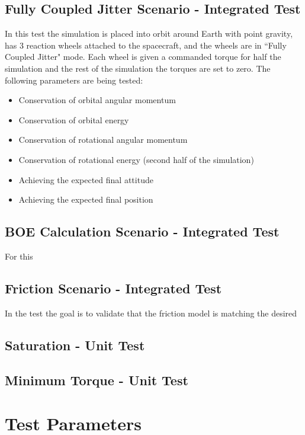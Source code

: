 \subsection{Fully Coupled Jitter Scenario - Integrated Test}
In this test the simulation is placed into orbit around Earth with point gravity, has 3 reaction wheels attached to the spacecraft, and the wheels are in ``Fully Coupled Jitter" mode. Each wheel is given a commanded torque for half the simulation and the rest of the simulation the torques are set to zero. The following parameters are being tested:
\begin{itemize}
\item Conservation of orbital angular momentum
\item Conservation of orbital energy
\item Conservation of rotational angular momentum
\item Conservation of rotational energy (second half of the simulation)
\item Achieving the expected final attitude
\item Achieving the expected final position
\end{itemize}

\subsection{BOE Calculation Scenario - Integrated Test}

For this 

\subsection{Friction Scenario - Integrated Test}

In the test the goal is to validate that the friction model is matching the desired 

\subsection{Saturation - Unit Test}

\subsection{Minimum Torque - Unit Test}

\section{Test Parameters}

